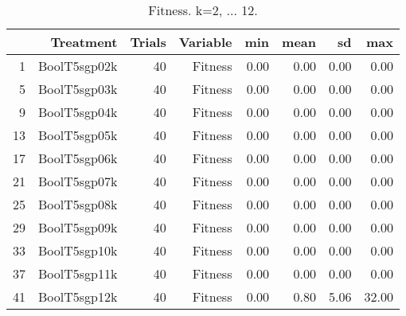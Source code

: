 \begin{table}[ht]
\centering
\begin{tabular}{rrrrrrrr}
  \hline
 & Treatment & Trials & Variable & min & mean & sd & max \\ 
  \hline
1 & BoolT5sgp02k &  40 & Fitness & 0.00 & 0.00 & 0.00 & 0.00 \\ 
  5 & BoolT5sgp03k &  40 & Fitness & 0.00 & 0.00 & 0.00 & 0.00 \\ 
  9 & BoolT5sgp04k &  40 & Fitness & 0.00 & 0.00 & 0.00 & 0.00 \\ 
  13 & BoolT5sgp05k &  40 & Fitness & 0.00 & 0.00 & 0.00 & 0.00 \\ 
  17 & BoolT5sgp06k &  40 & Fitness & 0.00 & 0.00 & 0.00 & 0.00 \\ 
  21 & BoolT5sgp07k &  40 & Fitness & 0.00 & 0.00 & 0.00 & 0.00 \\ 
  25 & BoolT5sgp08k &  40 & Fitness & 0.00 & 0.00 & 0.00 & 0.00 \\ 
  29 & BoolT5sgp09k &  40 & Fitness & 0.00 & 0.00 & 0.00 & 0.00 \\ 
  33 & BoolT5sgp10k &  40 & Fitness & 0.00 & 0.00 & 0.00 & 0.00 \\ 
  37 & BoolT5sgp11k &  40 & Fitness & 0.00 & 0.00 & 0.00 & 0.00 \\ 
  41 & BoolT5sgp12k &  40 & Fitness & 0.00 & 0.80 & 5.06 & 32.00 \\ 
   \hline
\end{tabular}
\caption{Fitness. k=2, ... 12.} 
\end{table}
